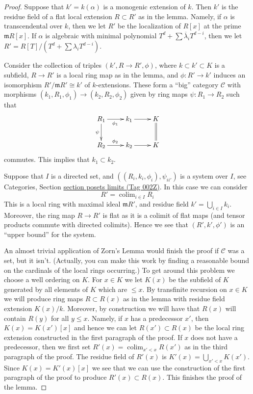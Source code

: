 \documentclass{amsart}
\theoremstyle{plain}
\theoremstyle{definition}
\theoremstyle{remark}
\numberwithin{equation}{subsection}
\def\colim{\mathop{\mathrm{colim}}\nolimits}
\begin{document}
\begin{proof}
Suppose that $k' = k(\alpha)$ is a monogenic extension of $k$.
Then $k'$ is the residue field of a flat local extension $R \subset R'$
as in the lemma. Namely, if $\alpha$ is transcendental over $k$, then we let
$R'$ be the localization of $R[x]$ at the prime $\mathfrak mR[x]$.
If $\alpha$ is algebraic with minimal polynomial
$T^d + \sum \overline{\lambda}_iT^{d - i}$, then we let
$R' = R[T]/(T^d + \sum \lambda_i T^{d - i})$.

\medskip\noindent
Consider the collection of triples $(k', R \to R', \phi)$, where
$k \subset k' \subset K$ is a subfield,
$R \to R'$ is a local ring map as in the lemma, and
$\phi : R' \to k'$ induces an isomorphism $R'/\mathfrak mR' \cong k'$
of $k$-extensions. These form a ``big'' category $\mathcal{C}$ with morphisms
$(k_1, R_1, \phi_1) \to (k_2, R_2, \phi_2)$
given by ring maps $\psi : R_1 \to R_2$ such that
$$
\xymatrix{
R_1 \ar[d]_\psi \ar[r]_{\phi_1} & k_1 \ar[r] & K \ar@{=}[d] \\
R_2 \ar[r]^{\phi_2} & k_2 \ar[r] & K
}
$$
commutes. This implies that $k_1 \subset k_2$.

\medskip\noindent
Suppose that $I$ is a directed set, and
$((R_i, k_i, \phi_i), \psi_{ii'})$ is a system over $I$, see
Categories, Section \href{https://stacks.math.columbia.edu/tag/002Z}{section posets limits (Tag 002Z)}.
In this case we can consider
$$
R' = \colim_{i \in I} R_i
$$
This is a local ring with maximal ideal $\mathfrak mR'$, and
residue field $k' = \bigcup_{i \in I} k_i$. Moreover, the ring
map $R \to R'$ is flat as it is a colimit of flat maps (and tensor
products commute with directed colimits).
Hence we see that $(R', k', \phi')$ is an ``upper bound'' for the system.

\medskip\noindent
An almost trivial application of Zorn's Lemma would finish the proof
if $\mathcal{C}$ was a set, but it isn't.
(Actually, you can make this work by finding a reasonable bound on the
cardinals of the local rings occurring.)
To get around this problem we choose a well ordering on $K$.
For $x \in K$ we let $K(x)$ be the subfield of $K$ generated
by all elements of $K$ which are $\leq x$.
By transfinite recursion on $x \in K$ we will produce ring maps
$R \subset R(x)$ as in the lemma with residue field extension
$K(x)/k$. Moreover, by construction we will have that
$R(x)$ will contain $R(y)$ for all $y \leq x$.
Namely, if $x$ has a predecessor $x'$, then $K(x) = K(x')[x]$
and hence we can let $R(x') \subset R(x)$ be the local ring extension
constructed in the first paragraph of the proof. If $x$ does not
have a predecessor, then we first set
$R'(x) = \colim_{x' < x} R(x')$ as in the third paragraph
of the proof. The residue field of $R'(x)$ is $K'(x) = \bigcup_{x' < x} K(x')$.
Since $K(x) = K'(x)[x]$ we see that we can use the construction of the
first paragraph of the proof to produce $R'(x) \subset R(x)$.
This finishes the proof of the lemma.
\end{proof}
\end{document}
